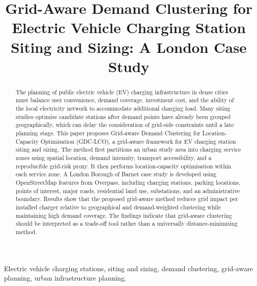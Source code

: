 \documentclass[conference]{IEEEtran}
\title{Grid-Aware Demand Clustering for Electric Vehicle Charging Station Siting and Sizing: A London Case Study}
\author{
\IEEEauthorblockN{Author Name}
\IEEEauthorblockA{Department or Institution\\
Email: author@example.com}
}
\begin{document}
\maketitle

\begin{abstract}
The planning of public electric vehicle (EV) charging infrastructure in dense cities must balance user convenience, demand coverage, investment cost, and the ability of the local electricity network to accommodate additional charging load. Many siting studies optimise candidate stations after demand points have already been grouped geographically, which can delay the consideration of grid-side constraints until a late planning stage. This paper proposes Grid-aware Demand Clustering for Location-Capacity Optimisation (GDC-LCO), a grid-aware framework for EV charging station siting and sizing. The method first partitions an urban study area into charging service zones using spatial location, demand intensity, transport accessibility, and a reproducible grid-risk proxy. It then performs location-capacity optimisation within each service zone. A London Borough of Barnet case study is developed using OpenStreetMap features from Overpass, including charging stations, parking locations, points of interest, major roads, residential land use, substations, and an administrative boundary. Results show that the proposed grid-aware method reduces grid impact per installed charger relative to geographical and demand-weighted clustering while maintaining high demand coverage. The findings indicate that grid-aware clustering should be interpreted as a trade-off tool rather than a universally distance-minimising method.
\end{abstract}

\begin{IEEEkeywords}
Electric vehicle charging stations, siting and sizing, demand clustering, grid-aware planning, urban infrastructure planning.
\end{IEEEkeywords}










\end{document}
